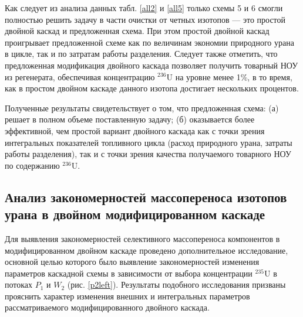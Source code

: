 Как следует из анализа данных табл. \ref{all2} и \ref{all5} только схемы 5 и 6 смогли полностью решить задачу в части очистки от четных изотопов --- это простой двойной каскад и предложенная схема. При этом простой двойной каскад проигрывает предложенной схеме как по величинам экономии природного урана в цикле, так и по затратам работы разделения. Следует также отметить, что предложенная модификация двойного каскада позволяет получить товарный НОУ из регенерата, обеспечивая концентрацию $^{236}$U на уровне менее 1\%, в то время, как в простом двойном каскаде данного изотопа достигает нескольких процентов. 

Полученные результаты свидетельствует о том, что предложенная схема: (а) решает в полном объеме поставленную задачу; (б) оказывается более эффективной, чем простой вариант двойного каскада как с точки зрения интегральных показателей топливного цикла (расход природного урана, затраты работы разделения), так и с точки зрения качества получаемого товарного НОУ по содержанию $^{236}$U.

\subsection{Анализ закономерностей массопереноса изотопов урана в двойном модифицированном каскаде}

Для выявления закономерностей селективного массопереноса компонентов в модифицированном двойном каскаде  проведено дополнительное исследование, основной целью которого было выявление закономерностей изменения параметров каскадной схемы в зависимости от выбора концентрации $^{235}$U в потоках $P_1$ и $W_2$ (рис. \ref{p2left}). Результаты подобного исследования призваны прояснить характер изменения внешних и интегральных параметров рассматриваемого модифицированного двойного каскада.

